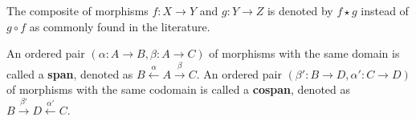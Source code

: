 \begin{remark}
    The composite of morphisms \( f: X \to Y \) and \( g: Y \to Z \) is denoted by \( f \star g \) instead of \( g \circ f \) as commonly found in the literature.
\end{remark}



\begin{definition}
    An ordered pair \(( \alpha : A \to B, \beta : A \to C )\) of morphisms with the same domain is called a \textbf{span}, denoted as \( B \overset{\alpha}{\leftarrow} A \overset{\beta}{\rightarrow} C \). 
    An ordered pair \(( \beta' : B \to D, \alpha' : C \to D )\) of morphisms with the same codomain is called a \textbf{cospan}, denoted as \( B \overset{\beta'}{\rightarrow} D \overset{\alpha'}{\leftarrow} C \). 
\end{definition}

